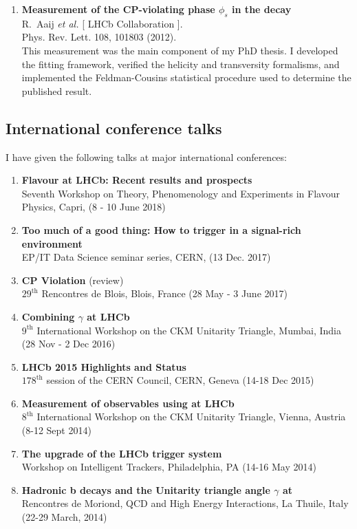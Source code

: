 \begin{enumerate}
    \item {\bf{Measurement of the CP-violating phase $\phi_s$ in the decay \BsToJpsiPhi}} \\%
         {R.~Aaij {\it et al.} [ LHCb Collaboration ].} \\%
         Phys. Rev. Lett. 108, 101803 (2012). \\
         This measurement was the main component of my PhD thesis. I developed the fitting framework, verified the helicity and transversity formalisms, and implemented the Feldman-Cousins statistical procedure used to determine the published result.

  \end{enumerate}

\subsection*{International conference talks} 
I have given the following talks at major international conferences:
  \begin{enumerate}
    \setlength\itemsep{1ex}
          \item {\bf Flavour at LHCb: Recent results and prospects }\\
        Seventh Workshop on Theory, Phenomenology and Experiments in Flavour Physics, Capri, (8 - 10 June 2018)
   \item {\bf Too much of a good thing: How to trigger in a signal-rich environment} \\
        EP/IT Data Science seminar series, CERN, (13 Dec. 2017)
    \item {\bf CP Violation} (review)\\
            $29^{\textrm{th}}$ Rencontres de Blois, Blois, France (28 May - 3 June 2017)
    \item {\bf Combining $\gamma$ at LHCb}\\
            $9^{\textrm{th}}$ International Workshop on the CKM Unitarity Triangle, Mumbai, India (28 Nov - 2 Dec 2016)
    \item {\bf LHCb 2015 Highlights and Status}\\
            $178^{\textrm{th}}$ session of the CERN Council, CERN, Geneva (14-18 Dec 2015)
    \item {\bf Measurement of \CP observables using \BsToDsDs at LHCb}\\
            $8^{\textrm{th}}$ International Workshop on the CKM Unitarity Triangle, Vienna, Austria (8-12 Sept 2014)
    \item {\bf The upgrade of the LHCb trigger system}\\
            Workshop on Intelligent Trackers, Philadelphia, PA (14-16 May 2014)
    \item {\bf Hadronic b decays and the Unitarity triangle angle $\gamma$ at \LHCb}\\
      Rencontres de Moriond, QCD and High Energy Interactions, La Thuile, Italy (22-29 March, 2014)
  \end{enumerate}

